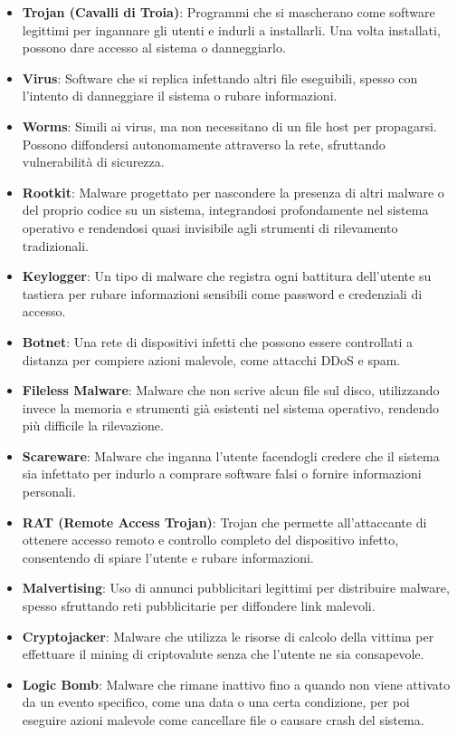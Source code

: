 \begin{itemize}
    \item \textbf{Trojan (Cavalli di Troia)}: Programmi che si mascherano come software legittimi per ingannare gli utenti e indurli a installarli. Una volta installati, possono dare accesso al sistema o danneggiarlo.
    \item \textbf{Virus}: Software che si replica infettando altri file eseguibili, spesso con l'intento di danneggiare il sistema o rubare informazioni.
    \item \textbf{Worms}: Simili ai virus, ma non necessitano di un file host per propagarsi. Possono diffondersi autonomamente attraverso la rete, sfruttando vulnerabilità di sicurezza.
    \item \textbf{Rootkit}: Malware progettato per nascondere la presenza di altri malware o del proprio codice su un sistema, integrandosi profondamente nel sistema operativo e rendendosi quasi invisibile agli strumenti di rilevamento tradizionali.
    \item \textbf{Keylogger}: Un tipo di malware che registra ogni battitura dell'utente su tastiera per rubare informazioni sensibili come password e credenziali di accesso.
    \item \textbf{Botnet}: Una rete di dispositivi infetti che possono essere controllati a distanza per compiere azioni malevole, come attacchi DDoS e spam.
    \item \textbf{Fileless Malware}: Malware che non scrive alcun file sul disco, utilizzando invece la memoria e strumenti già esistenti nel sistema operativo, rendendo più difficile la rilevazione.
    \item \textbf{Scareware}: Malware che inganna l'utente facendogli credere che il sistema sia infettato per indurlo a comprare software falsi o fornire informazioni personali.
    \item \textbf{RAT (Remote Access Trojan)}: Trojan che permette all'attaccante di ottenere accesso remoto e controllo completo del dispositivo infetto, consentendo di spiare l'utente e rubare informazioni.
    \item \textbf{Malvertising}: Uso di annunci pubblicitari legittimi per distribuire malware, spesso sfruttando reti pubblicitarie per diffondere link malevoli.
    \item \textbf{Cryptojacker}: Malware che utilizza le risorse di calcolo della vittima per effettuare il mining di criptovalute senza che l'utente ne sia consapevole.
    \item \textbf{Logic Bomb}: Malware che rimane inattivo fino a quando non viene attivato da un evento specifico, come una data o una certa condizione, per poi eseguire azioni malevole come cancellare file o causare crash del sistema.
\end{itemize}

